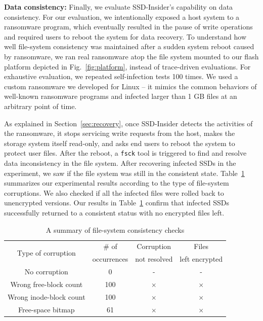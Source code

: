 \documentclass[conference]{IEEEtran}
\newcommand{\ours}{SSD-Insider}
\begin{document}
{\bf Data consistency:} 
Finally, we evaluate \ours{}'s capability on data consistency.  For
our evaluation, we intentionally exposed a host system to a
ransomware program, which eventually resulted in the pause of write
operations and required users to reboot the system for data
recovery.  To understand how well file-system consistency was
maintained after a sudden system reboot caused by ransomware,  we
ran real ransomware atop the file system mounted to our flash
platform depicted in Fig.~\ref{fig:platform}, instead of
trace-driven evaluations.  For exhaustive evaluation, we repeated
self-infection tests 100 times.  We used a custom ransomware we
developed for Linux -- it mimics the common behaviors of well-known
ransomware programs and infected larger than 1 GB files at an
arbitrary point of time.

As explained in Section~\ref{sec:recovery}, once \ours{} detects
the activities of the ransomware, it stops servicing write requests
from the host, makes the storage system itself read-only, and asks
end users to reboot the system to protect user files.  After the
reboot, a \texttt{fsck} tool is triggered to find and resolve data
inconsistency in the file system. After recovering infected SSDs in
the experiment, we saw if the file system was still in the
consistent state.  Table~\ref{tab:flash-consist} summarizes our
experimental results according to the type of file-system
corruptions. We also checked if all the infected files were rolled
back to unencrypted versions. Our results in
Table~\ref{tab:flash-consist} confirm that infected SSDs
successfully returned to a consistent status with no encrypted
files left.

\begin{table}[t]
	\centering
	\caption{A summary of file-system consistency checks}
	\begin{tabular}{c|c|c|c}
		\hline
		\multirow{2}{*}{Type of corruption}   & \# of 			& 	Corruption 		& Files \\
											  & occurrences 	&   not resolved	& left encrypted \\
		\hline
		\hline
		No corruption			& 0  			& -  	     & - \\ 
		Wrong free-block count 	& 100 & $\times$ & $\times$ \\ 
		Wrong inode-block count & 100 & $\times$ & $\times$ \\ 
		Free-space bitmap		& 61  & $\times$ & $\times$ \\ 
		\hline
	\end{tabular}
	\label{tab:flash-consist}
\end{table}
\end{document}
